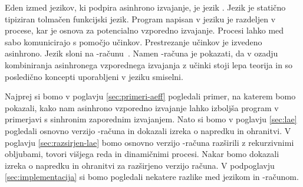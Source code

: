 Eden izmed jezikov, ki podpira asinhrono izvajanje, je jezik \aeff{}. Jezik \aeff{} je statično tipiziran tolmačen funkcijski jezik. Program napisan v jeziku \aeff{} je razdeljen v procese, kar je osnova za potencialno vzporedno izvajanje. Procesi lahko med sabo komunicirajo s pomočjo učinkov. Prestrezanje učinkov je izvedeno asinhrono.
Jezik \aeff{} sloni na \lae{}-računu~\cite{aeff}. Namen \lae{}-računa je pokazati, da v ozadju kombiniranja asinhronega vzporednega izvajanja z učinki stoji lepa teorija in so posledično koncepti uporabljeni v jeziku \aeff{} smiselni.

Najprej si bomo v poglavju \ref{sec:primeri-aeff} pogledali primer, na katerem bomo pokazali, kako nam asinhrono vzporedno izvajanje lahko izboljša program v primerjavi s sinhronim zaporednim izvajanjem.
Nato si bomo v poglavju \ref{sec:lae} pogledali osnovno verzijo \lae{}-računa in dokazali izreka o napredku in ohranitvi. V poglavju \ref{sec:razsirjen-lae} bomo osnovno verzijo \lae{}-računa razširili z rekurzivnimi obljubami, tovori višjega reda in dinamičnimi procesi. Nakar bomo dokazali izreka o napredku in ohranitvi za razširjeno verzijo računa. V podpoglavju \ref{sec:implementacija} si bomo pogledali nekatere razlike med jezikom \aeff{} in \lae{}-računom.